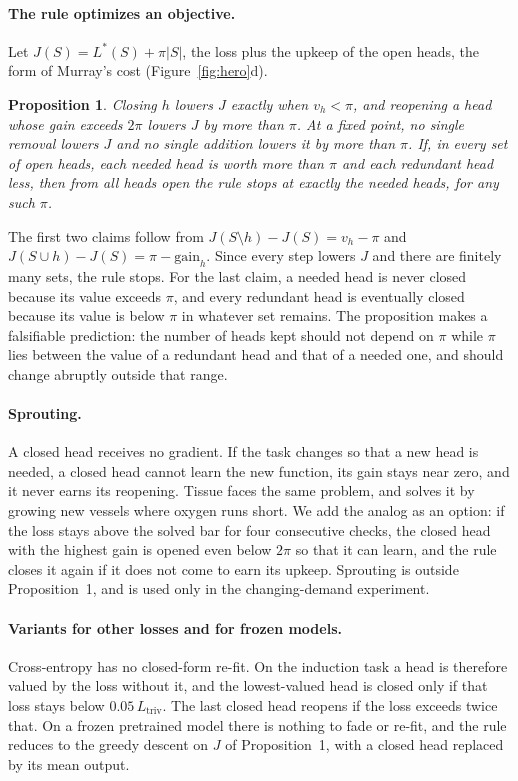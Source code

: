 \documentclass[letterpaper]{article} %
\newtheorem{proposition}{Proposition}
\newcommand{\Ltriv}{L_{\mathrm{triv}}}
\begin{document}
\paragraph{The rule optimizes an objective.} Let $J(S)=L^\ast(S)+\pi|S|$, the loss plus the upkeep of the open heads, the form of Murray's cost (Figure~\ref{fig:hero}d).
\begin{proposition}
Closing $h$ lowers $J$ exactly when $v_h<\pi$, and reopening a head whose gain exceeds $2\pi$ lowers $J$ by more than $\pi$. At a fixed point, no single removal lowers $J$ and no single addition lowers it by more than $\pi$. If, in every set of open heads, each needed head is worth more than $\pi$ and each redundant head less, then from all heads open the rule stops at exactly the needed heads, for any such $\pi$.
\end{proposition}
The first two claims follow from $J(S\setminus h)-J(S)=v_h-\pi$ and $J(S\cup h)-J(S)=\pi-\mathrm{gain}_h$. Since every step lowers $J$ and there are finitely many sets, the rule stops. For the last claim, a needed head is never closed because its value exceeds $\pi$, and every redundant head is eventually closed because its value is below $\pi$ in whatever set remains. The proposition makes a falsifiable prediction: the number of heads kept should not depend on $\pi$ while $\pi$ lies between the value of a redundant head and that of a needed one, and should change abruptly outside that range.

\paragraph{Sprouting.} A closed head receives no gradient. If the task changes so that a new head is needed, a closed head cannot learn the new function, its gain stays near zero, and it never earns its reopening. Tissue faces the same problem, and solves it by growing new vessels where oxygen runs short. We add the analog as an option: if the loss stays above the solved bar for four consecutive checks, the closed head with the highest gain is opened even below $2\pi$ so that it can learn, and the rule closes it again if it does not come to earn its upkeep. Sprouting is outside Proposition~1, and is used only in the changing-demand experiment.

\paragraph{Variants for other losses and for frozen models.} Cross-entropy has no closed-form re-fit. On the induction task a head is therefore valued by the loss without it, and the lowest-valued head is closed only if that loss stays below $0.05\,\Ltriv$. The last closed head reopens if the loss exceeds twice that. On a frozen pretrained model there is nothing to fade or re-fit, and the rule reduces to the greedy descent on $J$ of Proposition~1, with a closed head replaced by its mean output.
\end{document}
